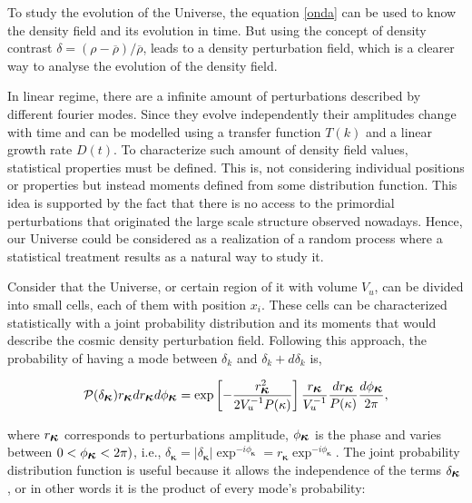 To study the evolution of the Universe, the equation \ref{onda} can be used to know 
the density field and its evolution in time. 
But using the concept of density contrast $\delta = (\rho - \overline{\rho})/\overline{\rho}$, 
leads to a density perturbation field, which is a clearer way to analyse the evolution
of the density field.

In linear regime, there are a infinite amount of perturbations described by different 
fourier modes. Since they evolve independently their amplitudes change with time and 
can be modelled using a transfer function $T(k)$ and a linear growth rate $D(t)$. 
To characterize such amount of density field values, statistical 
properties must be defined. 
This is, not considering individual positions or properties but instead moments defined from
some distribution function. This idea is supported by the fact that there is no access 
to the primordial perturbations that originated the large scale structure observed 
nowadays. Hence, our Universe could be considered as a realization of a random process 
where a statistical treatment results as a natural way to study it. 

Consider that the Universe, or certain region of it with volume $V_u$, 
can be divided into small cells, each of them with position 
$x_i$. These cells can be characterized statistically with a joint probability 
distribution and its moments that would describe the 
cosmic density perturbation field. 
Following this approach, the probability of having a mode between $\delta_k$ and 
$\delta_{k}+d\delta_k$ is, 

\begin{equation}
\mathcal{P}(\delta_{\mbox{\boldmath$\kappa$}})r_{\mbox{\boldmath$\kappa$}}dr_{\mbox{\boldmath$\kappa$}}d\phi_{\mbox{\boldmath$\kappa$}}
=
\exp\left[-\frac{r_{\mbox{\boldmath$\kappa$}}^2}{2V_u^{-1}P(\kappa)}\right]	\frac{r_{\mbox{\boldmath$\kappa$}}}{V_u^{-1}}
\frac{dr_{\mbox{\boldmath$\kappa$}}}{P(\kappa)}\frac{d\phi_{\mbox{\boldmath$\kappa$}}}{2\pi},
\label{probabilidad}
\end{equation}


where $r_{\mbox{\boldmath$\kappa$}}$ corresponds to perturbations amplitude,  $\phi_{\mbox{\boldmath$\kappa$}}$ 
is the phase and varies between $0< \phi_{\mbox{\boldmath$\kappa$}} < 2\pi)$, i.e., $\delta_{\bm{\kappa}}=|\delta_{\bm{\kappa}}|\exp^{-i\phi_{\bm{\kappa}}} = r_{\bm{\kappa}} \exp^{-i\phi_{\bm\kappa}}$. The joint probability distribution function is useful because it allows the independence of the terms $\delta_{\mbox{\boldmath$\kappa$}}$, 
or in other words it is the product of every mode's probability:

